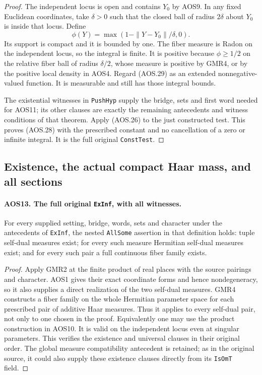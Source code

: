 \documentclass[11pt,a4paper]{article}
\numberwithin{equation}{section}
\theoremstyle{remark}\newtheorem{remark}[theorem]{Remark}
\begin{document}
\begin{proof}
The independent locus is open and contains $Y_0$ by AOS9.  In any
fixed Euclidean coordinates, take $\delta>0$ such that the closed
ball of radius $2\delta$ about $Y_0$ is inside that locus.  Define
\[
             \phi(Y)=\max(1-\|Y-Y_0\|/\delta,0).
 \tag{AOS.29}
\]
Its support is compact and it is bounded by one.  The fiber measure
is Radon on the independent locus, so the integral is finite.
It is positive because $\phi\geq1/2$ on the relative fiber ball of
radius $\delta/2$, whose measure is positive by GMR4, or by the
positive local density in AOS4.  Regard (AOS.29) as an extended
nonnegative-valued function.  It is measurable and still has those
integral bounds.

The existential witnesses in \texttt{Push\allowbreak Hyp} supply the bridge,
sets and first word needed for AOS11; its other clauses are exactly
the remaining antecedents and witness conditions of that theorem.
Apply (AOS.26) to the just constructed test.  This proves (AOS.28)
with the prescribed constant and no cancellation of a zero or
infinite integral.  It is the full original \texttt{Const\allowbreak Test}.
\end{proof}

\subsection{Existence, the actual compact Haar mass, and all sections}

\paragraph{AOS13. The full original \texttt{Ex\allowbreak Inf}, with all witnesses.}
\label{claim:AOS13}
For every supplied setting, bridge, words, sets and character under
the antecedents of \texttt{Ex\allowbreak Inf}, the nested \texttt{All\allowbreak Some} assertion
in that definition holds: tuple self-dual measures exist; for every
such measure Hermitian self-dual measures exist; and for every such
pair a full continuous fiber family exists.

\begin{proof}
Apply GMR2 at the finite product of real places with the source
pairings and character.  AOS1 gives their exact coordinate forms
and hence nondegeneracy, so it also supplies a direct realization
of the two self-dual measures.  GMR4 constructs a fiber family on
the whole Hermitian parameter space for each prescribed pair of
additive Haar measures.  Thus it applies to every self-dual pair,
not only to one chosen in the proof.  Equivalently one may use the
product construction in AOS10.  It is valid on the independent
locus even at singular parameters.  This verifies the existence
and universal clauses in their original order.  The global measure
compatibility antecedent is retained; as in the original source,
it could also supply these existence clauses directly from its
\texttt{Is\allowbreak Om\allowbreak T} field.
\end{proof}
\end{document}
